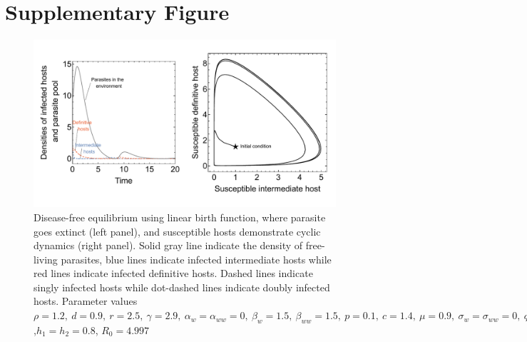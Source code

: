 \documentclass[11pt]{article}
\begin{document}
\section*{Supplementary Figure}
%
\begin{figure}[!ht]
\includegraphics[width=\textwidth]{Figures/diseasefree_linear.pdf}
\caption{Disease-free equilibrium using linear birth function, where parasite goes extinct (left panel), and susceptible hosts demonstrate cyclic dynamics (right panel). Solid gray line indicate the density of free-living parasites, blue lines indicate infected intermediate hosts while red lines indicate infected definitive hosts. Dashed lines indicate singly infected hosts while dot-dashed lines indicate doubly infected hosts. Parameter values  $\rho = 1.2, \  d = 0.9, \  r = 2.5, \ \gamma = 2.9, \ \alpha_w =  \alpha_{ww} =  0, \ \beta_w  = 1.5, \ \beta_{ww} = 1.5, \ p = 0.1,  \ c = 1.4, \ \mu = 0.9,  \ \sigma_w = \sigma_{ww} = 0, \ q = 0.01, \  f_w = 6.5, \  f_{ww} = 7.5, \ \delta = 0.9$,$h_1 = h_2 = 0.8$, $R_0 = 4.997$ } 
\label{fig:diseasefree:linear}
\end{figure}



\end{document}
